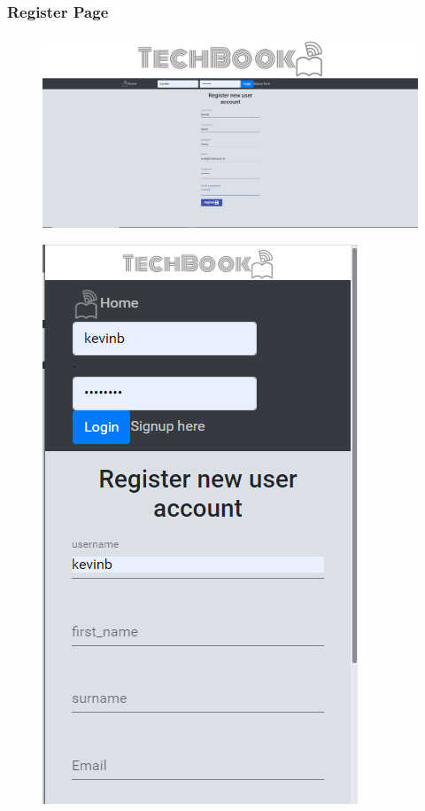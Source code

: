 \subsubsection{Register Page}
\begin{figure}[H]
\centering
\begin{minipage}{.75\textwidth}
  \centering
  \includegraphics[width=.9\linewidth]{img/ui/sigup_PC.PNG}
  \label{fig:signupPC}
\end{minipage}%
\begin{minipage}{.25\textwidth}
  \centering
  \includegraphics[width=.9\linewidth]{img/ui/signup_MOBILE.PNG}
  \label{fig:signupMOBILE}
\end{minipage}
\end{figure}

